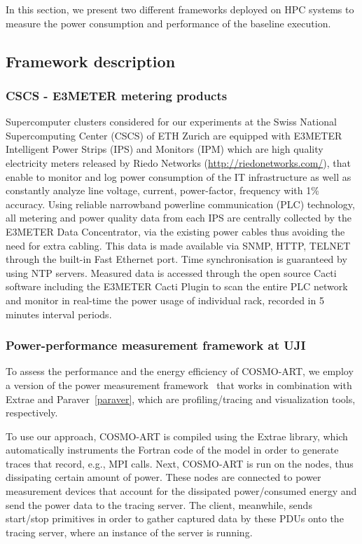 In this section,  we present two different frameworks  deployed on HPC
systems  to  measure the  power  consumption  and  performance of  the
baseline execution.

\subsection{Framework description}
\label{subsec:3.1}

\subsubsection{CSCS - E3METER metering products}
Supercomputer  clusters considered  for our  experiments at  the Swiss
National Supercomputing Center (CSCS)  of ETH Zurich are equipped with
E3METER Intelligent  Power Strips (IPS)  and Monitors (IPM)  which are
high   quality   electricity  meters   released   by  Riedo   Networks
(\url{http://riedonetworks.com/}),  that  enable  to monitor  and  log
power  consumption of  the  IT infrastructure  as  well as  constantly
analyze  line  voltage,  current,  power-factor,  frequency  with  1\%
accuracy.   Using reliable  narrowband  powerline communication  (PLC)
technology,  all metering  and power  quality data  from each  IPS are
centrally collected by the E3METER Data Concentrator, via the existing
power cables thus  avoiding the need for extra  cabling.  This data is
made  available  via SNMP,  HTTP,  TELNET  through  the built-in  Fast
Ethernet  port.   Time  synchronisation  is guaranteed  by  using  NTP
servers.   Measured data  is accessed  through the  open  source Cacti
software including  the E3METER  Cacti Plugin to  scan the  entire PLC
network and monitor  in real-time the power usage  of individual rack,
recorded in 5 minutes interval periods.

\subsubsection{Power-performance measurement framework at UJI}

To assess the  performance and the energy efficiency  of COSMO-ART, we
employ   a    version   of   the \pmlib power measurement framework~\cite{energy13} that works in  combination with Extrae and Paraver~\ref{paraver},
which are profiling/tracing and visualization tools, respectively.

To use our approach, COSMO-ART is compiled using the Extrae library, 
which  automatically instruments the Fortran  code of  the
model in order to generate traces that record, e.g., MPI calls.
Next, COSMO-ART  is run on the nodes,  thus dissipating certain
amount  of power. These nodes are connected to power measurement devices that account
for the dissipated power/consumed energy and send the power data to the tracing server. 
The client,  meanwhile, sends start/stop  primitives  in  order  to  gather  captured  data  by  these PDUs onto the  tracing server, where an instance  of the \pmlib server is running.

